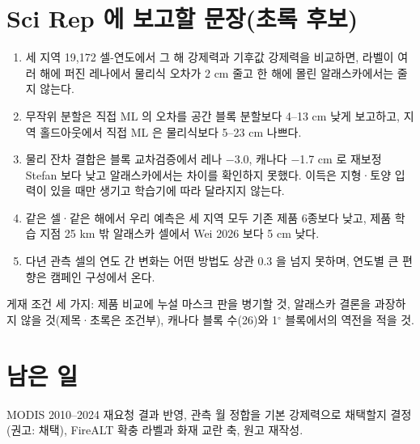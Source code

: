 \documentclass[10pt]{article}
\begin{document}
\section{Sci Rep 에 보고할 문장(초록 후보)}
\begin{enumerate}[leftmargin=1.4em,itemsep=0.1em]
\item 세 지역 19,172 셀-연도에서 그 해 강제력과 기후값 강제력을 비교하면, 라벨이 여러 해에 퍼진 레나에서 물리식 오차가 2 cm 줄고 한 해에 몰린 알래스카에서는 줄지 않는다.
\item 무작위 분할은 직접 ML 의 오차를 공간 블록 분할보다 4--13 cm 낮게 보고하고, 지역 홀드아웃에서 직접 ML 은 물리식보다 5--23 cm 나쁘다.
\item 물리 잔차 결합은 블록 교차검증에서 레나 $-$3.0, 캐나다 $-$1.7 cm 로 재보정 Stefan 보다 낮고 알래스카에서는 차이를 확인하지 못했다. 이득은 지형·토양 입력이 있을 때만 생기고 학습기에 따라 달라지지 않는다.
\item 같은 셀·같은 해에서 우리 예측은 세 지역 모두 기존 제품 6종보다 낮고, 제품 학습 지점 25 km 밖 알래스카 셀에서 Wei 2026 보다 5 cm 낮다.
\item 다년 관측 셀의 연도 간 변화는 어떤 방법도 상관 0.3 을 넘지 못하며, 연도별 큰 편향은 캠페인 구성에서 온다.
\end{enumerate}
게재 조건 세 가지: 제품 비교에 누설 마스크 판을 병기할 것, 알래스카 결론을 과장하지 않을 것(제목·초록은 조건부), 캐나다 블록 수(26)와 1$^\circ$ 블록에서의 역전을 적을 것.

\section{남은 일}
MODIS 2010--2024 재요청 결과 반영, 관측 월 정합을 기본 강제력으로 채택할지 결정(권고: 채택), FireALT 확충 라벨과 화재 교란 축, 원고 재작성.
\end{document}
